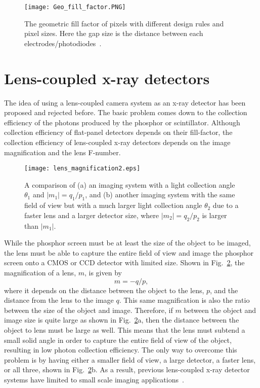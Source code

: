 \begin{figure}[h]
\texttt{[image: Geo\_fill\_factor.PNG]}
\caption{The geometric fill factor of pixels with different design rules and pixel sizes.  Here the gap size is the distance between each electrodes/photodiodes~\citep{Rowlands2000}.}
\label{fig:fill_factor}
\end{figure}

\section{Lens-coupled x-ray detectors}
The idea of using a lens-coupled camera system as an x-ray detector has been proposed and rejected before.  The basic problem comes down to the collection efficiency of the photons produced by the phosphor or scintillator.  Although collection efficiency of flat-panel detectors depends on their fill-factor, the collection efficiency of lens-coupled x-ray detectors depends on the image magnification and the lens F-number.

\begin{figure}[h]
\texttt{[image: lens\_magnification2.eps]}
\caption{A comparison of (a) an imaging system with a light collection angle $\theta_1$ and $\lvert m_1 \rvert = q_1/p_1$, and (b) another imaging system with the same field of view but with a much larger light collection angle $\theta_2$ due to a faster lens and a larger detector size, where $ \lvert m_2 \rvert = q_2/p_2$ is larger than $\lvert m_1 \rvert$.}
\label{fig:lens_magnification}
\end{figure}

While the phosphor screen must be at least the size of the object to be imaged, the lens must be able to capture the entire field of view and image the phosphor screen onto a CMOS or CCD detector with limited size.  Shown in Fig.~\ref{fig:lens_magnification}, the magnification of a lens, $m$, is given by
%
\begin{equation}
m = -q/p,
\label{eqn:magnification}
\end{equation}
%
where it depends on the distance between the object to the lens, $p$, and the distance from the lens to the image $q$.  This same magnification is also the ratio between the size of the object and image.  Therefore, if $m$ between the object and image size is quite large as shown in Fig.~\ref{fig:lens_magnification}a, then the distance between the object to lens must be large as well.  This means that the lens must subtend a small solid angle in order to capture the entire field of view of the object, resulting in low photon collection efficiency.  The only way to overcome this problem is by having either a smaller field of view, a large detector, a faster lens, or all three, shown in Fig.~\ref{fig:lens_magnification}b.  As a result, previous lens-coupled x-ray detector systems have limited to small scale imaging applications~\citep{lee2001, kim2005, tate2005, madden2006}.  

